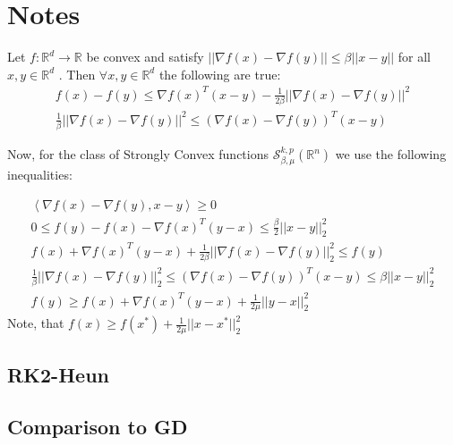 \section{Notes}
\begin{lemma}
Let $f : \mathbb{R}^d \rightarrow \mathbb{R}$  be convex and satisfy $|| \nabla f(x) - \nabla f(y) || \leq \beta || x -y ||$ for all $x,y \in \mathbb{R}^d$ . Then $\forall x,y \in \mathbb{R}^d$ the following are true:
\begin{align}
f(x) - f(y) \leq \nabla f(x)^T (x-y) - \frac{1}{2 \beta} || \nabla f(x) - \nabla f(y) ||^2 \\
\frac{1}{\beta} || \nabla f(x) - \nabla f(y) ||^2  \leq( \nabla f(x) - \nabla f(y))^T(x-y)
\end{align}
\end{lemma}
Now, for the class of Strongly Convex functions $\mathcal{S}_{\beta,\mu}^{k,p}(\mathbb{R}^n)$ we use the following inequalities:

\begin{equation}
\begin{aligned}
\left\langle \nabla f(x) -\nabla f(y), x-y \right\rangle \geq 0 \\
 0 \leq f(y) - f(x) -\nabla f(x)^T (y-x) \leq \frac{\beta}{2}||x-y||_2^2 \\
f(x) + \nabla f(x)^T (y-x) + \frac{1}{2\beta}||\nabla f(x)-\nabla f(y)||_2^2 \leq f(y) \\
\frac{1}{\beta}|| \nabla f(x)-\nabla f(y) ||_2^2 \leq(\nabla f(x)-\nabla f(y))^T(x-y) \leq \beta || x -y ||_2^2  \\
f(y) \geq f(x) + \nabla f(x)^T (y-x) + \frac{1}{2\mu}||y-x||_2^2
\end{aligned}
\end{equation}
Note, that $f(x) \geq f(x^*) + \frac{1}{2\mu}||x-x^*||_2^2 $
\subsection{RK2-Heun}


\subsection{Comparison to GD}
